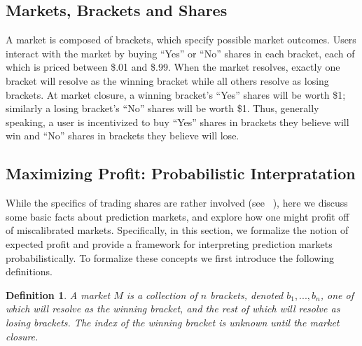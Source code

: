 \documentclass{article}
\newtheorem{definition}{Definition}
\begin{document}
\subsection{Markets, Brackets and Shares}
A market is composed of brackets, which specify possible market outcomes. Users interact with the market by buying ``Yes'' or ``No''
shares in each bracket, each of which is priced between \$.01 and \$.99. When the market resolves, exactly one bracket will resolve as the winning bracket while all others resolve as losing brackets.
At market closure, a winning bracket's ``Yes'' shares will be worth \$1; similarly a losing bracket's ``No'' shares will be worth \$1.
Thus, generally speaking, a user is incentivized to buy ``Yes'' shares in brackets they believe will win and ``No'' shares in brackets
they believe will lose.

\subsection{Maximizing Profit: Probabilistic Interpratation}
While the specifics of trading shares are rather involved (see ~\cite{trading}), here we discuss some basic facts about prediction markets, and explore
how one might profit off of miscalibrated markets. Specifically, in this section, we formalize the notion of expected profit and provide a framework for
interpreting prediction markets probabilistically. To formalize these concepts we first introduce the following definitions.
\begin{definition}
    A market $M$ is a collection of $n$ brackets, denoted $b_1,...,b_n$, one of which will resolve as the winning bracket, and the rest of which will
    resolve as losing brackets. The index of the winning bracket is unknown until the market closure.
\end{definition}
\end{document}
